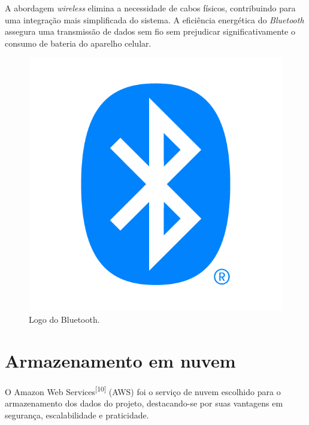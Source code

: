 
A abordagem \textit{wireless} elimina a necessidade de cabos físicos, contribuindo para uma integração mais simplificada do sistema. A eficiência energética do \textit{Bluetooth} assegura uma transmissão de dados sem fio sem prejudicar significativamente o consumo de bateria do aparelho celular.



 \begin{figure}[hp]
    \centering
    
    \includegraphics[scale=0.4]{figures/bluetooth.png}
    
    \caption{Logo do Bluetooth.}
    
\end{figure}

\section{Armazenamento em nuvem}
O Amazon Web Services\textsuperscript{[10]} (AWS) foi o serviço de nuvem escolhido para o armazenamento dos dados do projeto, destacando-se por suas vantagens em segurança, escalabilidade e praticidade. 

